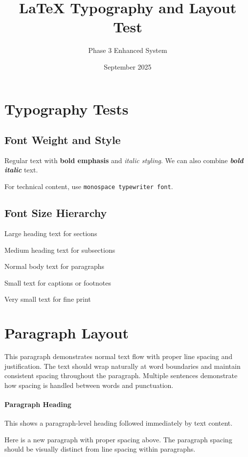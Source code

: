 \documentclass{article}
\title{LaTeX Typography and Layout Test}
\author{Phase 3 Enhanced System}
\date{September 2025}
\begin{document}
\maketitle

\section{Typography Tests}

\subsection{Font Weight and Style}

Regular text with \textbf{bold emphasis} and \textit{italic styling}. We can also combine \textbf{\textit{bold italic}} text.

For technical content, use \texttt{monospace typewriter font}.

\subsection{Font Size Hierarchy}

{\Large Large heading text for sections}

{\large Medium heading text for subsections}

{\normalsize Normal body text for paragraphs}

{\small Small text for captions or footnotes}

{\footnotesize Very small text for fine print}

\section{Paragraph Layout}

This paragraph demonstrates normal text flow with proper line spacing and justification. The text should wrap naturally at word boundaries and maintain consistent spacing throughout the paragraph. Multiple sentences demonstrate how spacing is handled between words and punctuation.

\paragraph{Paragraph Heading} This shows a paragraph-level heading followed immediately by text content.

Here is a new paragraph with proper spacing above. The paragraph spacing should be visually distinct from line spacing within paragraphs.
\end{document}
